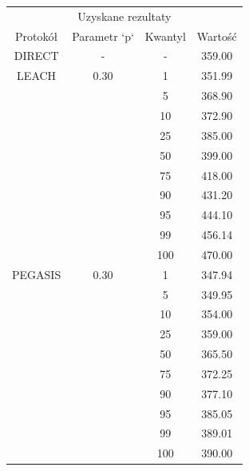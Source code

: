 \documentclass[a4paper,12pt,twoside,openany]{report}
\begin{document}
\begin{longtable}{*{4}{c}}
\toprule
\multicolumn{4}{c}{Uzyskane rezultaty} \\
Protokół	& Parametr `p`	& Kwantyl	& Wartość \\
\midrule
\endhead
DIRECT	& - 	& -	& 359.00 \\*
\midrule
LEACH	& 0.30	& 1	& 351.99 \\*
	&	& 5	& 368.90 \\*
	&	& 10	& 372.90 \\*
	&	& 25	& 385.00 \\*
	&	& 50	& 399.00 \\*
	&	& 75	& 418.00 \\*
	&	& 90	& 431.20 \\*
	&	& 95	& 444.10 \\*
	&	& 99	& 456.14 \\*
	&	& 100	& 470.00 \\*
\midrule
PEGASIS	& 0.30	& 1	& 347.94 \\*
	&	& 5	& 349.95 \\*
	&	& 10	& 354.00 \\*
	&	& 25	& 359.00 \\*
	&	& 50	& 365.50 \\*
	&	& 75	& 372.25 \\*
	&	& 90	& 377.10 \\*
	&	& 95	& 385.05 \\*
	&	& 99	& 389.01 \\*
	&	& 100	& 390.00 \\*
\bottomrule
\end{longtable}
\end{document}
